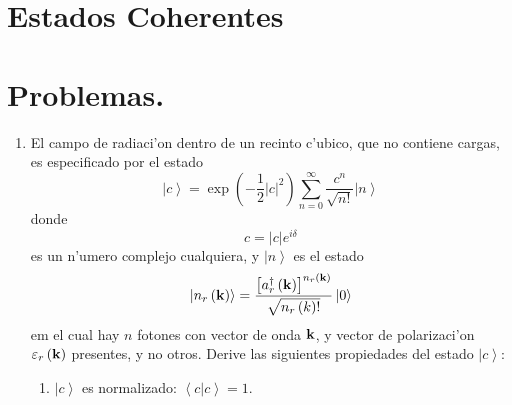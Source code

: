 \section{Estados Coherentes}

\section{Problemas.}

\begin{enumerate}
\item El campo de radiaci'on dentro de un recinto c'ubico, que no
contiene cargas, es especificado por el estado 
\begin{equation}
\left| c\right> =\exp \left( -\frac{1}{2}\left| c\right| ^{2}\right)
\sum_{n=0}^{\infty }\frac{c^{n}}{\sqrt{n!}}\left| n\right> 
\end{equation}
donde 
\begin{equation}
c=\left| c\right| e^{i\delta }
\end{equation}
es un n'umero complejo cualquiera, y $\left| n\right> $ es el
estado 
\begin{equation}
\left| n_{r}\left( {\bf k}\right) \right> =\frac{\left[
a_{r}^{\dagger }\left( {\bf k}\right) \right] ^{n_{r}\left( {\bf k}%
\right) }}{\sqrt{n_{r}\left( k\right) !}}\left| 0\right> 
\end{equation}
em el cual hay $n$ fotones con vector de onda ${\bf k}$, y vector de
polarizaci'on ${\bf \varepsilon }_{r}\left( {\bf k}\right) $
presentes, y no otros. Derive las siguientes propiedades del estado $\left|
c\right> $:

\begin{enumerate}
\item $\left| c\right> $ es normalizado: $\left\langle
c|c\right> =1$.


\end{enumerate}
\end{enumerate}
